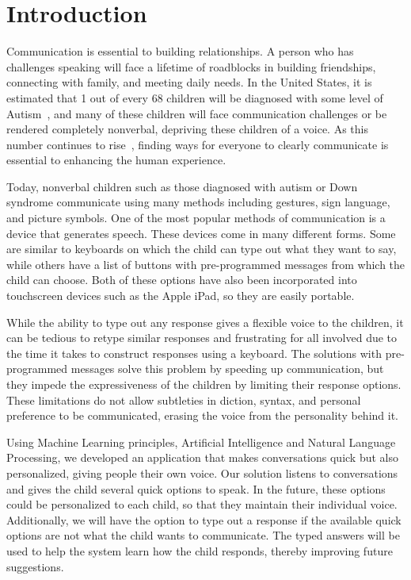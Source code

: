 \chapter{Introduction}

Communication is essential to building relationships. A person who has challenges speaking will face a lifetime of roadblocks in building friendships, connecting with family, and meeting daily needs. In the United States, it is estimated that 1 out of every 68 children will be diagnosed with some level of Autism~\cite{maguire}, and many of these children will face communication challenges or be rendered completely nonverbal, depriving these children of a voice. As this number continues to rise~\cite{christensen}, finding ways for everyone to clearly communicate is essential to enhancing the human experience.

Today, nonverbal children such as those diagnosed with autism or Down syndrome communicate using many methods including gestures, sign language, and picture symbols. One of the most popular methods of communication is a device that generates speech. These devices come in many different forms. Some are similar to keyboards on which the child can type out what they want to say, while others have a list of buttons with pre-programmed messages from which the child can choose. Both of these options have also been incorporated into touchscreen devices such as the Apple iPad, so they are easily portable. 

While the ability to type out any response gives a flexible voice to the children, it can be tedious to retype similar responses and frustrating for all involved due to the time it takes to construct responses using a keyboard. The solutions with pre-programmed messages solve this problem by speeding up communication, but they impede the expressiveness of the children by limiting their response options. These limitations do not allow subtleties in diction, syntax, and personal preference to be communicated, erasing the voice from the personality behind it.

Using Machine Learning principles, Artificial Intelligence and Natural Language Processing, we developed an application that makes conversations quick but also personalized, giving people their own voice. Our solution listens to conversations and gives the child several quick options to speak. In the future, these options could be personalized to each child, so that they maintain their individual voice. Additionally, we will have the option to type out a response if the available quick options are not what the child wants to communicate. The typed answers will be used to help the system learn how the child responds, thereby improving future suggestions.

